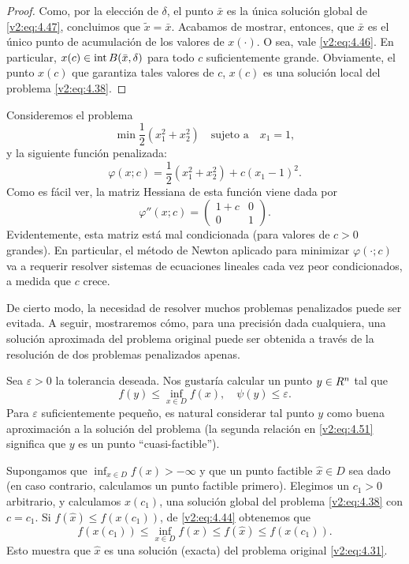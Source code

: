 \begin{proof}
    Como, por la elección de $\delta$, el punto $\bar{x}$ es la única solución global de \eqref{v2:eq:4.47}, concluimos que $\tilde{x} = \bar{x}$. Acabamos de mostrar, entonces, que $\bar{x}$ es el único punto de acumulación de los valores de $x(\cdot)$. O sea, vale \eqref{v2:eq:4.46}. En particular, $x(c) \in \operatorname{\operatorname{int}} B(\bar{x}, \delta)$ para todo $c$ suficientemente grande. Obviamente, el punto $x(c)$ que garantiza tales valores de $c$, $x(c)$ es una solución local del problema \eqref{v2:eq:4.38}.
\end{proof}


\begin{example}\label{v2:exa:4.3.3}
    Consideremos el problema
    \[
        \min \frac{1}{2}(x_1^2 + x_2^2) \quad \text{sujeto a} \quad x_1 = 1,
    \]
    y la siguiente función penalizada:
    \[
        \varphi(x; c) = \frac{1}{2}(x_1^2 + x_2^2) + c(x_1 - 1)^2.
    \]
    Como es fácil ver, la matriz Hessiana de esta función viene dada por
    \[
        \varphi''(x; c) = \begin{pmatrix} 1 + c & 0 \\ 0 & 1 \end{pmatrix}.
    \]
    Evidentemente, esta matriz está mal condicionada (para valores de $c > 0$ grandes). En particular, el método de Newton aplicado para minimizar $\varphi(\cdot; c)$ va a requerir resolver sistemas de ecuaciones lineales cada vez peor condicionados, a medida que $c$ crece.
\end{example}

De cierto modo, la necesidad de resolver muchos problemas penalizados puede ser evitada. A seguir, mostraremos cómo, para una precisión dada cualquiera, una solución aproximada del problema original puede ser obtenida a través de la resolución de dos problemas penalizados apenas.

Sea $\varepsilon > 0$ la tolerancia deseada. Nos gustaría calcular un punto $y \in R^n$ tal que
\begin{equation}
    f(y) \le \inf_{x \in D} f(x), \quad \psi(y) \le \varepsilon.
    \label{v2:eq:4.51}
\end{equation}
Para $\varepsilon$ suficientemente pequeño, es natural considerar tal punto $y$ como buena aproximación a la solución del problema (la segunda relación en \eqref{v2:eq:4.51} significa que $y$ es un punto ``cuasi-factible'').

Supongamos que $\inf_{x \in D} f(x) > -\infty$ y que un punto factible $\hat{x} \in D$ sea dado (en caso contrario, calculamos un punto factible primero). Elegimos un $c_1 > 0$ arbitrario, y calculamos $x(c_1)$, una solución global del problema \eqref{v2:eq:4.38} con $c = c_1$.
Si $f(\hat{x}) \le f(x(c_1))$, de \eqref{v2:eq:4.44} obtenemos que
\[
    f(x(c_1)) \le \inf_{x \in D} f(x) \le f(\hat{x}) \le f(x(c_1)).
\]
Esto muestra que $\hat{x}$ es una solución (exacta) del problema original \eqref{v2:eq:4.31}.

